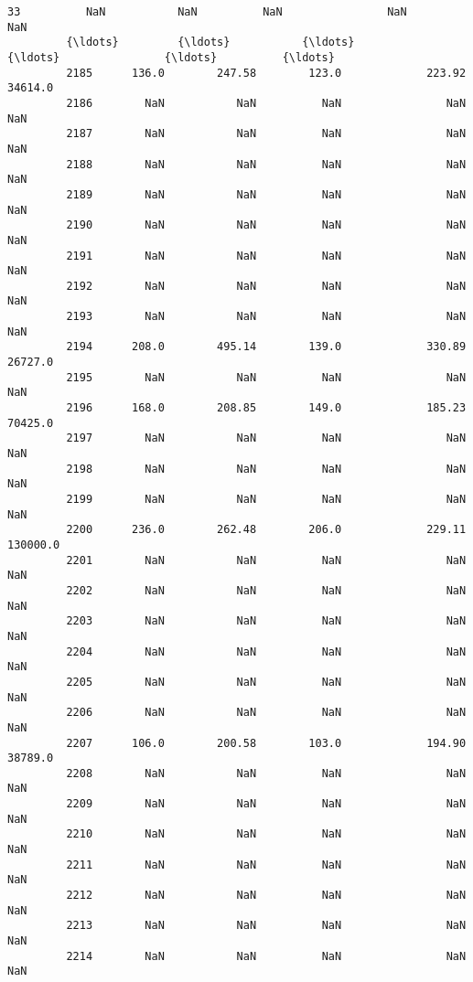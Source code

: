 \documentclass[11pt]{llncs}
\begin{document}
\begin{Verbatim}[commandchars=\\\{\}]
         33          NaN           NaN          NaN                NaN          NaN   
         {\ldots}         {\ldots}           {\ldots}          {\ldots}                {\ldots}          {\ldots}   
         2185      136.0        247.58        123.0             223.92      34614.0   
         2186        NaN           NaN          NaN                NaN          NaN   
         2187        NaN           NaN          NaN                NaN          NaN   
         2188        NaN           NaN          NaN                NaN          NaN   
         2189        NaN           NaN          NaN                NaN          NaN   
         2190        NaN           NaN          NaN                NaN          NaN   
         2191        NaN           NaN          NaN                NaN          NaN   
         2192        NaN           NaN          NaN                NaN          NaN   
         2193        NaN           NaN          NaN                NaN          NaN   
         2194      208.0        495.14        139.0             330.89      26727.0   
         2195        NaN           NaN          NaN                NaN          NaN   
         2196      168.0        208.85        149.0             185.23      70425.0   
         2197        NaN           NaN          NaN                NaN          NaN   
         2198        NaN           NaN          NaN                NaN          NaN   
         2199        NaN           NaN          NaN                NaN          NaN   
         2200      236.0        262.48        206.0             229.11     130000.0   
         2201        NaN           NaN          NaN                NaN          NaN   
         2202        NaN           NaN          NaN                NaN          NaN   
         2203        NaN           NaN          NaN                NaN          NaN   
         2204        NaN           NaN          NaN                NaN          NaN   
         2205        NaN           NaN          NaN                NaN          NaN   
         2206        NaN           NaN          NaN                NaN          NaN   
         2207      106.0        200.58        103.0             194.90      38789.0   
         2208        NaN           NaN          NaN                NaN          NaN   
         2209        NaN           NaN          NaN                NaN          NaN   
         2210        NaN           NaN          NaN                NaN          NaN   
         2211        NaN           NaN          NaN                NaN          NaN   
         2212        NaN           NaN          NaN                NaN          NaN   
         2213        NaN           NaN          NaN                NaN          NaN   
         2214        NaN           NaN          NaN                NaN          NaN   
         

\end{Verbatim}
\end{document}
